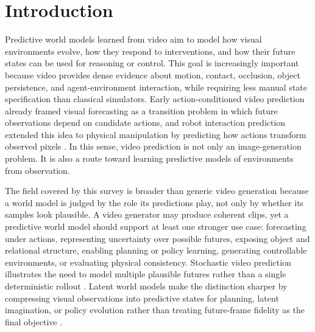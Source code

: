 \section{Introduction}
\label{sec:introduction}

Predictive world models learned from video aim to model how visual environments evolve, how they respond to interventions, and how their future states can be used for reasoning or control. This goal is increasingly important because video provides dense evidence about motion, contact, occlusion, object persistence, and agent-environment interaction, while requiring less manual state specification than classical simulators. Early action-conditioned video prediction already framed visual forecasting as a transition problem in which future observations depend on candidate actions, and robot interaction prediction extended this idea to physical manipulation by predicting how actions transform observed pixels \cite{oh2015_action_conditional_video_prediction_prov,finn2016_physical_interaction_video_prediction_prov}. In this sense, video prediction is not only an image-generation problem. It is also a route toward learning predictive models of environments from observation.

The field covered by this survey is broader than generic video generation because a world model is judged by the role its predictions play, not only by whether its samples look plausible. A video generator may produce coherent clips, yet a predictive world model should support at least one stronger use case: forecasting under actions, representing uncertainty over possible futures, exposing object and relational structure, enabling planning or policy learning, generating controllable environments, or evaluating physical consistency. Stochastic video prediction illustrates the need to model multiple plausible futures rather than a single deterministic rollout \cite{babaeizadeh2018_sv2p_prov}. Latent world models make the distinction sharper by compressing visual observations into predictive states for planning, latent imagination, or policy evolution rather than treating future-frame fidelity as the final objective \cite{ha2018_world_models_prov,hafner2019_planet_prov,hafner2020_dreamer_prov}.

